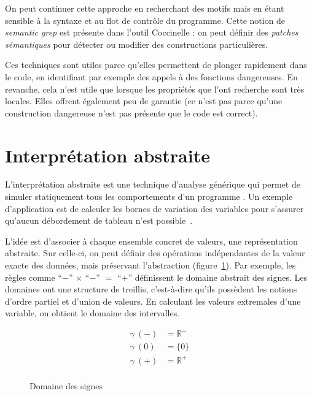 On peut continuer cette approche en recherchant des motifs mais en étant
sensible à la syntaxe et au flot de contrôle du programme. Cette notion de
\emph{semantic grep} est présente dans l'outil Coccinelle
\cite{coccinelle09,coccinelle11}: on peut définir des
\emph{patches sémantiques} pour détecter ou modifier des constructions
particulières.

Ces techniques sont utiles parce qu'elles permettent de plonger rapidement dans
le code, en identifiant par exemple des appels à des fonctions dangereuses. En
revanche, cela n'est utile que lorsque les propriétés que l'ont recherche sont
très locales. Elles offrent également peu de garantie (ce n'est pas parce qu'une
construction dangereuse n'est pas présente que le code est correct).

\section{Interprétation abstraite}

L'interprétation abstraite est une technique d'analyse générique qui permet de
simuler statiquement tous les comportements d'un programme
\cite{Cousot77,Cousot92-1}. Un exemple d'application est de calculer les bornes
de variation des variables pour s'assurer qu'aucun débordement de tableau n'est
possible~\cite{AllamigeonHymansSSTIC07}.

L'idée est d'associer à chaque ensemble concret de valeurs, une représentation
abstraite. Sur celle-ci, on peut définir des opérations indépendantes de la
valeur exacte des données, mais préservant l'abstraction
(figure~\ref{fig:dom-sig}). Par exemple, les règles comme
``$-$'' $×$ ``$-$'' $=$ ``$+$''
définissent le domaine abstrait des signes. Les domaines ont une structure de
treillis, c'est-à-dire qu'ils possèdent les notions d'ordre partiel et d'union
de valeurs. En calculant les valeurs extremales d'une variable, on obtient le
domaine des intervalles.

\begin{figure}%
\centering

\begin{minipage}{0.4\textwidth}
\end{minipage}
\begin{minipage}{0.4\textwidth}
  \begin{align*}
  γ~(-) &= ℝ^- \\
  γ~(0) &= \{0\} \\
  γ~(+) &= ℝ^+ \\
  \end{align*}
\end{minipage}

\caption{Domaine des signes}
\label{fig:dom-sig}
\end{figure}%

